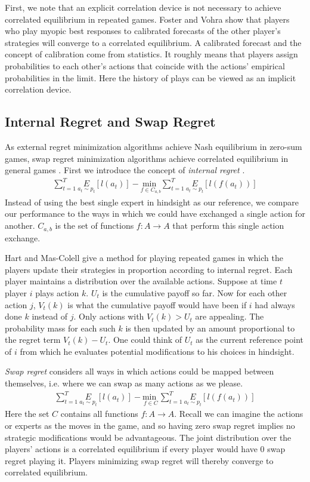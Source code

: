 \documentclass{article}
\begin{document}
First, we note that an explicit correlation device is not necessary to achieve correlated equilibrium in repeated games. Foster and Vohra \cite{foster1997calibrated} show that players who play myopic best responses to calibrated forecasts of the other player's strategies will converge to a correlated equilibrium. A calibrated forecast and the concept of calibration come from statistics. It roughly means that players assign probabilities to each other's actions that coincide with the actions' empirical probabilities in the limit. Here the history of plays can be viewed as an implicit correlation device.

\subsection{Internal Regret and Swap Regret}

As external regret minimization algorithms achieve Nash equilibrium in zero-sum games, swap regret minimization algorithms achieve correlated equilibrium in general games \cite{blum2007external}. First we introduce the concept of \emph{internal regret} \cite{foster1998asymptotic}.
\begin{align*}
\sum_{t=1}^T \underset{a_t \sim p_t}{E}[l(a_t)] - \underset{f \in C_{a,b}}{\text{min }} \sum_{t=1}^T \underset{a_t \sim p_t}{E}[l(f(a_t))]
\end{align*}
Instead of using the best single expert in hindsight as our reference, we compare our performance to the ways in which we could have exchanged a single action for another. $C_{a,b}$ is the set of functions $f: A \rightarrow A$ that perform this single action exchange.

Hart and Mas-Colell\cite{hart2000simple} give a method for playing repeated games in which the players update their strategies in proportion according to internal regret. Each player maintains a distribution over the available actions. Suppose at time $t$ player $i$ plays action $k$. $U_t$ is the cumulative payoff so far. Now for each other action $j$, $V_t(k)$ is what the cumulative payoff would have been if $i$ had always done $k$ instead of $j$. Only actions with $V_t(k) > U_t$ are appealing. The probability mass for each such $k$ is then updated by an amount proportional to the regret term $V_t(k) - U_t$. One could think of $U_t$ as the current reference point of $i$ from which he evaluates potential modifications to his choices in hindsight.

\emph{Swap regret} considers all ways in which actions could be mapped between themselves, i.e. where we can swap as many actions as we please.
\begin{align*}
\sum_{t=1}^T \underset{a_t \sim p_t}{E}[l(a_t)] - \underset{f \in C}{\text{min }} \sum_{t=1}^T \underset{a_t \sim p_t}{E}[l(f(a_t))]
\end{align*}
Here the set $C$ contains all functions $f: A \rightarrow A$. Recall we can imagine the actions or experts as the moves in the game, and so having zero swap regret implies no strategic modifications would be advantageous. The joint distribution over the players' actions is a correlated equilibrium if every player would have 0 swap regret playing it. Players minimizing swap regret will thereby converge to correlated equilibrium.
\end{document}
